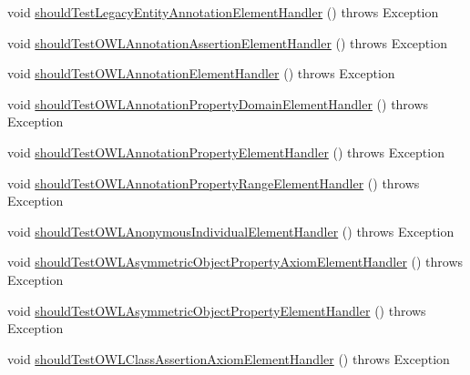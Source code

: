 \begin{DoxyCompactItemize}
\item 
void \hyperlink{classorg_1_1semanticweb_1_1owlapi_1_1contract_1_1_contract_owlxmlparser_test_acc493254690805b0d8cc55f632ab408b}{should\-Test\-Legacy\-Entity\-Annotation\-Element\-Handler} ()  throws Exception 
\item 
void \hyperlink{classorg_1_1semanticweb_1_1owlapi_1_1contract_1_1_contract_owlxmlparser_test_ad3a133d1e16d7ec325758f119f00f7d5}{should\-Test\-O\-W\-L\-Annotation\-Assertion\-Element\-Handler} ()  throws Exception 
\item 
void \hyperlink{classorg_1_1semanticweb_1_1owlapi_1_1contract_1_1_contract_owlxmlparser_test_a3f3ef6db14a854c7762a0b7c4eb41eb2}{should\-Test\-O\-W\-L\-Annotation\-Element\-Handler} ()  throws Exception 
\item 
void \hyperlink{classorg_1_1semanticweb_1_1owlapi_1_1contract_1_1_contract_owlxmlparser_test_a41751198908371a838c5ffc217750135}{should\-Test\-O\-W\-L\-Annotation\-Property\-Domain\-Element\-Handler} ()  throws Exception 
\item 
void \hyperlink{classorg_1_1semanticweb_1_1owlapi_1_1contract_1_1_contract_owlxmlparser_test_a5064472eaa19e96db20637c32cdb66ea}{should\-Test\-O\-W\-L\-Annotation\-Property\-Element\-Handler} ()  throws Exception 
\item 
void \hyperlink{classorg_1_1semanticweb_1_1owlapi_1_1contract_1_1_contract_owlxmlparser_test_a6fd4feb7e88de35cdfc5e87086fc0c6f}{should\-Test\-O\-W\-L\-Annotation\-Property\-Range\-Element\-Handler} ()  throws Exception 
\item 
void \hyperlink{classorg_1_1semanticweb_1_1owlapi_1_1contract_1_1_contract_owlxmlparser_test_ad672eee9fc687d281add751946c22a8f}{should\-Test\-O\-W\-L\-Anonymous\-Individual\-Element\-Handler} ()  throws Exception 
\item 
void \hyperlink{classorg_1_1semanticweb_1_1owlapi_1_1contract_1_1_contract_owlxmlparser_test_a90f12073848bbf4f513c1f0313830ec1}{should\-Test\-O\-W\-L\-Asymmetric\-Object\-Property\-Axiom\-Element\-Handler} ()  throws Exception 
\item 
void \hyperlink{classorg_1_1semanticweb_1_1owlapi_1_1contract_1_1_contract_owlxmlparser_test_a036fe64533ec563dde26b440d808149e}{should\-Test\-O\-W\-L\-Asymmetric\-Object\-Property\-Element\-Handler} ()  throws Exception 
\item 
void \hyperlink{classorg_1_1semanticweb_1_1owlapi_1_1contract_1_1_contract_owlxmlparser_test_ae9d7b2c4977088ee3e728f5376fd1e02}{should\-Test\-O\-W\-L\-Class\-Assertion\-Axiom\-Element\-Handler} ()  throws Exception 

\end{DoxyCompactItemize}
